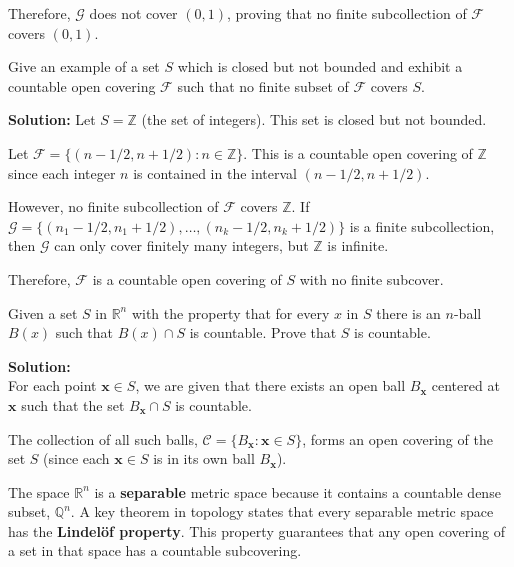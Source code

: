 Therefore, $\mathcal{G}$ does not cover $(0,1)$, proving that no finite subcollection of $\mathcal{F}$ covers $(0,1)$.

\begin{problembox}
Give an example of a set \( S \) which is closed but not bounded and exhibit a countable open covering \( \mathcal{F} \) such that no finite subset of \( \mathcal{F} \) covers \( S \).
\end{problembox}

\textbf{Solution:} Let $S = \mathbb{Z}$ (the set of integers). This set is closed but not bounded.

Let $\mathcal{F} = \{(n-1/2, n+1/2) : n \in \mathbb{Z}\}$. This is a countable open covering of $\mathbb{Z}$ since each integer $n$ is contained in the interval $(n-1/2, n+1/2)$.

However, no finite subcollection of $\mathcal{F}$ covers $\mathbb{Z}$. If $\mathcal{G} = \{(n_1-1/2, n_1+1/2), \ldots, (n_k-1/2, n_k+1/2)\}$ is a finite subcollection, then $\mathcal{G}$ can only cover finitely many integers, but $\mathbb{Z}$ is infinite.

Therefore, $\mathcal{F}$ is a countable open covering of $S$ with no finite subcover.

\begin{problembox}
Given a set \( S \) in \( \mathbb{R}^n \) with the property that for every \( x \) in \( S \) there is an \( n \)-ball \( B(x) \) such that \( B(x) \cap S \) is countable. Prove that \( S \) is countable.
\end{problembox}

\textbf{Solution:}\\
For each point $\mathbf{x} \in S$, we are given that there exists an open ball $B_\mathbf{x}$ centered at $\mathbf{x}$ such that the set $B_\mathbf{x} \cap S$ is countable.

The collection of all such balls, $\mathcal{C} = \{B_\mathbf{x} : \mathbf{x} \in S\}$, forms an open covering of the set $S$ (since each $\mathbf{x} \in S$ is in its own ball $B_\mathbf{x}$).

The space $\mathbb{R}^n$ is a \textbf{separable} metric space because it contains a countable dense subset, $\mathbb{Q}^n$. A key theorem in topology states that every separable metric space has the \textbf{Lindelöf property}. This property guarantees that any open covering of a set in that space has a countable subcovering.

